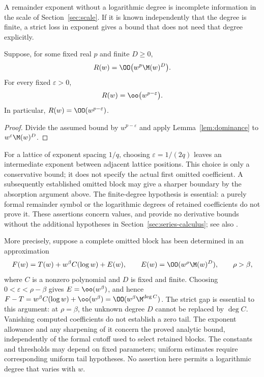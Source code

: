 A remainder exponent without a logarithmic degree is incomplete
information in the scale of Section~\ref{sec:scale}. If it is known
independently that the degree is finite, a strict loss in exponent gives
a bound that does not need that degree explicitly.

\begin{lemma}
\label{lem:special-function-logarithmic-margin}
Suppose, for some fixed real $p$ and finite $D\ge0$,
\[
 R(w)=\OO\bigl(w^p\M(w)^D\bigr).
\]
For every fixed $\varepsilon>0$,
\[
 R(w)=\oo\bigl(w^{p-\varepsilon}\bigr).
\]
In particular, $R(w)=\OO(w^{p-\varepsilon})$.
\end{lemma}
\begin{proof}
Divide the assumed bound by $w^{p-\varepsilon}$ and apply
Lemma~\ref{lem:dominance} to $w^\varepsilon\M(w)^D$.
\end{proof}

For a lattice of exponent spacing $1/q$, choosing
$\varepsilon=1/(2q)$ leaves an intermediate exponent between adjacent
lattice positions. This choice is only a conservative bound; it does not
specify the actual first omitted coefficient. A subsequently established
omitted block may give a sharper boundary by the absorption argument
above. The finite-degree hypothesis is essential: a purely formal
remainder symbol or the logarithmic degrees of retained coefficients do
not prove it. These assertions concern values, and provide no derivative
bounds without the additional hypotheses in
Section~\ref{sec:series-calculus}; see also \cite[\S2.1(iii)]{dlmf}.

More precisely, suppose a complete omitted block has been determined in
an approximation
\[
 F(w)=T(w)+w^\beta C(\log w)+E(w),\qquad
 E(w)=\OO(w^\rho\M(w)^D),\qquad \rho>\beta,
\]
where $C$ is a nonzero polynomial and $D$ is fixed and finite.
Choosing $0<\varepsilon<\rho-\beta$ gives $E=\oo(w^\beta)$, and hence
$F-T=w^\beta C(\log w)+\oo(w^\beta)
=\OO(w^\beta\M^{\deg C})$. The strict gap is essential to this
argument: at $\rho=\beta$, the unknown degree $D$ cannot be replaced by
$\deg C$. Vanishing computed coefficients do not establish a zero
tail. The exponent allowance and any sharpening of it concern the
proved analytic bound, independently of the formal cutoff used to
select retained blocks. The constants and thresholds may depend on
fixed parameters; uniform estimates require corresponding uniform tail
hypotheses. No assertion here permits a logarithmic degree that varies
with $w$.

